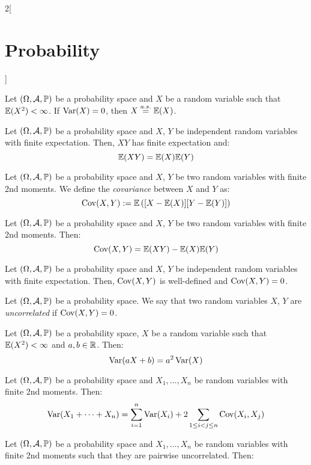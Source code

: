 \documentclass[../../../main.tex]{subfiles}
\begin{document}
\begin{multicols}{2}[\section{Probability}]
\begin{definition}
  \end{definition}
  \begin{prop}
    Let $(\Omega,\mathcal{A},\mathbb{P})$ be a probability space and $X$ be a random variable such that $\mathbb{E}(X^2)<\infty$. If $\operatorname{Var}(X)=0$, then $X\overset{a.s.}{=}\mathbb{E}(X)$.
  \end{prop}
  \begin{prop}
    Let $(\Omega,\mathcal{A},\mathbb{P})$ be a probability space and $X$, $Y$ be independent random variables with finite expectation. Then, $XY$ has finite expectation and: $$\mathbb{E}(XY)=\mathbb{E}(X)\mathbb{E}(Y)$$
  \end{prop}
  \begin{definition}[Covariance]
    Let $(\Omega,\mathcal{A},\mathbb{P})$ be a probability space and $X$, $Y$ be two random variables with finite 2nd moments. We define the \textit{covariance} between $X$ and $Y$ as: $$\operatorname{Cov}(X,Y):=\mathbb{E}\left([X-\mathbb{E}(X)][Y-\mathbb{E}(Y)]\right)$$
  \end{definition}
  \begin{prop}
    Let $(\Omega,\mathcal{A},\mathbb{P})$ be a probability space and $X$, $Y$ be two random variables with finite 2nd moments. Then: $$\operatorname{Cov}(X,Y)=\mathbb{E}(XY)-\mathbb{E}(X)\mathbb{E}(Y)$$
  \end{prop}
  \begin{prop}
    Let $(\Omega,\mathcal{A},\mathbb{P})$ be a probability space and $X$, $Y$ be independent random variables with finite expectation. Then, $\operatorname{Cov}(X,Y)$ is well-defined and $\operatorname{Cov}(X,Y)=0$.
  \end{prop}
  \begin{definition}
    Let $(\Omega,\mathcal{A},\mathbb{P})$ be a probability space. We say that two random variables $X$, $Y$ are \textit{uncorrelated} if $\operatorname{Cov}(X,Y)=0$.
  \end{definition}
  \begin{prop}
    Let $(\Omega,\mathcal{A},\mathbb{P})$ be a probability space, $X$ be a random variable such that $\mathbb{E}(X^2)<\infty$ and $a,b\in\mathbb{R}$. Then: $$\operatorname{Var}(aX+b)=a^2\operatorname{Var}(X)$$
  \end{prop}
  \begin{prop}
    Let $(\Omega,\mathcal{A},\mathbb{P})$ be a probability space and $X_1,\ldots,X_n$ be random variables with finite 2nd moments. Then:
    $$\operatorname{Var}(X_1+\cdots+X_n)=\sum_{i=1}^n\operatorname{Var}(X_i)+2\sum_{1\leq i<j\leq n}\operatorname{Cov}(X_i,X_j)$$
  \end{prop}
  \begin{corollary}
    Let $(\Omega,\mathcal{A},\mathbb{P})$ be a probability space and $X_1,\ldots,X_n$ be random variables with finite 2nd moments such that they are pairwise uncorrelated. Then:

\end{corollary}
\end{multicols}
\end{document}
